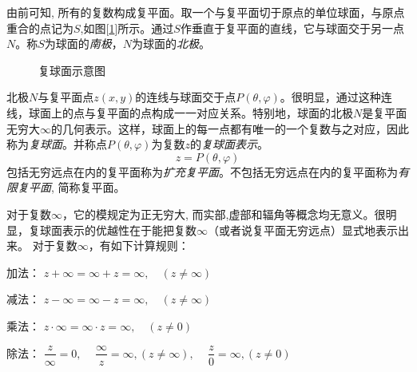 由前可知, 所有的复数构成复平面。取一个与复平面切于原点的单位球面，与原点重合的点记为$S$,如图[\ref{fig:fqm}]所示。通过$S$作垂直于复平面的直线，它与球面交于另一点$N$。称$S$为球面的\emph{南极}，$N$为球面的\emph{北极}。
\begin{figure}[htbp]
\centering
{}  
\caption{复球面示意图}
    \label{fig:fqm}
\end{figure}
北极$N$与复平面点$z(x,y)$的连线与球面交于点$P(\theta, \varphi)$。很明显，通过这种连线，球面上的点与复平面的点构成一一对应关系。特别地，球面的北极$N$是复平面无穷大$\infty$的几何表示。这样，球面上的每一点都有唯一的一个复数与之对应，因此称为\emph{复球面}。并称点$P(\theta, \varphi)$为复数$z$的\emph{复球面表示}。
\begin{equation}
    z = P(\theta, \varphi)
\end{equation}
包括无穷远点在内的复平面称为\emph{扩充复平面}。不包括无穷远点在内的复平面称为\emph{有限复平面}, 简称复平面。

对于复数$\infty$，它的模规定为正无穷大, 而实部,虚部和辐角等概念均无意义。很明显，复球面表示的优越性在于能把复数$\infty$（或者说复平面无穷远点）显式地表示出来。 对于复数$\infty$，有如下计算规则：
\begin{compactitem}
    \item 加法： $z + \infty = \infty +z = \infty, \quad ( z \ne \infty)$
    \item 减法： $z - \infty = \infty -z = \infty, \quad ( z \ne \infty)$
    \item 乘法： $z \cdot \infty = \infty \cdot z = \infty, \quad ( z \ne 0)$
    \item 除法： $\dfrac{z}{\infty} =0, \, \quad  \dfrac{\infty}{z} =\infty,(z \ne \infty ), \, \quad \dfrac{z}{0} =\infty, (z \ne 0)$
\end{compactitem}


